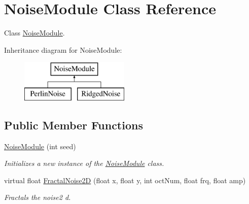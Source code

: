 \hypertarget{class_noise_module}{}\section{Noise\+Module Class Reference}
\label{class_noise_module}


Class \hyperlink{class_noise_module}{Noise\+Module}.  


Inheritance diagram for Noise\+Module\+:\begin{figure}[H]
\begin{center}
\leavevmode
\includegraphics[height=2.000000cm]{class_noise_module}
\end{center}
\end{figure}
\subsection*{Public Member Functions}
\begin{DoxyCompactItemize}
\item 
\hyperlink{class_noise_module_a018e785221494e50a0c4c0b72e71cf33}{Noise\+Module} (int seed)
\begin{DoxyCompactList}\small\item\em Initializes a new instance of the \hyperlink{class_noise_module}{Noise\+Module} class. \end{DoxyCompactList}\item 
virtual float \hyperlink{class_noise_module_afafa2edc32e9762dd4b379bede65ad16}{Fractal\+Noise2D} (float x, float y, int oct\+Num, float frq, float amp)
\begin{DoxyCompactList}\small\item\em Fractals the noise2 d. \end{DoxyCompactList}\end{DoxyCompactItemize}
